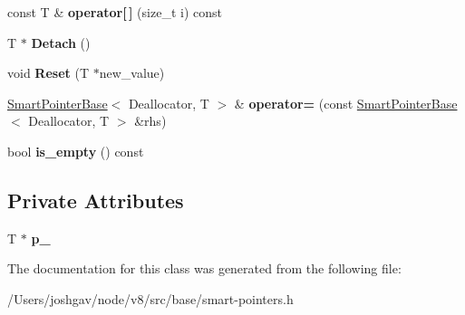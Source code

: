 \begin{DoxyCompactItemize}
\item 
const T \& {\bfseries operator\mbox{[}$\,$\mbox{]}} (size\+\_\+t i) const \hypertarget{classv8_1_1base_1_1_smart_pointer_base_a31a9291ccaa0a1862f2f3fa4b6d45fa5}{}\label{classv8_1_1base_1_1_smart_pointer_base_a31a9291ccaa0a1862f2f3fa4b6d45fa5}

\item 
T $\ast$ {\bfseries Detach} ()\hypertarget{classv8_1_1base_1_1_smart_pointer_base_a3ce7e9d910423b7fe5602a6c08b506ac}{}\label{classv8_1_1base_1_1_smart_pointer_base_a3ce7e9d910423b7fe5602a6c08b506ac}

\item 
void {\bfseries Reset} (T $\ast$new\+\_\+value)\hypertarget{classv8_1_1base_1_1_smart_pointer_base_a451de75a74643055813f879dc3653cd0}{}\label{classv8_1_1base_1_1_smart_pointer_base_a451de75a74643055813f879dc3653cd0}

\item 
\hyperlink{classv8_1_1base_1_1_smart_pointer_base}{Smart\+Pointer\+Base}$<$ Deallocator, T $>$ \& {\bfseries operator=} (const \hyperlink{classv8_1_1base_1_1_smart_pointer_base}{Smart\+Pointer\+Base}$<$ Deallocator, T $>$ \&rhs)\hypertarget{classv8_1_1base_1_1_smart_pointer_base_aa3d68dbf89dd54973190370550a2b6c5}{}\label{classv8_1_1base_1_1_smart_pointer_base_aa3d68dbf89dd54973190370550a2b6c5}

\item 
bool {\bfseries is\+\_\+empty} () const \hypertarget{classv8_1_1base_1_1_smart_pointer_base_ad9753c1c602d9ec234da6346218861b1}{}\label{classv8_1_1base_1_1_smart_pointer_base_ad9753c1c602d9ec234da6346218861b1}

\end{DoxyCompactItemize}
\subsection*{Private Attributes}
\begin{DoxyCompactItemize}
\item 
T $\ast$ {\bfseries p\+\_\+}\hypertarget{classv8_1_1base_1_1_smart_pointer_base_a6eeb14c1a5be13203d64a669e62fd58c}{}\label{classv8_1_1base_1_1_smart_pointer_base_a6eeb14c1a5be13203d64a669e62fd58c}

\end{DoxyCompactItemize}


The documentation for this class was generated from the following file\+:\begin{DoxyCompactItemize}
\item 
/\+Users/joshgav/node/v8/src/base/smart-\/pointers.\+h\end{DoxyCompactItemize}
